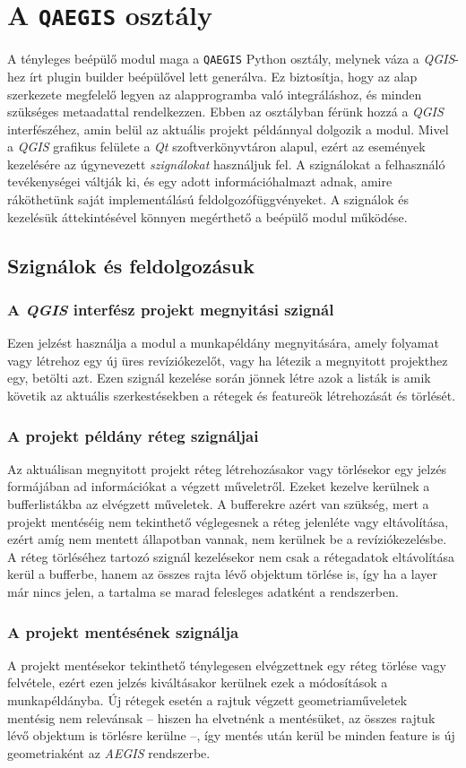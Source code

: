 \section{A \texttt{QAEGIS} osztály}
A tényleges beépülő modul maga a \texttt{QAEGIS} Python osztály, melynek váza a \emph{QGIS}-hez írt plugin builder beépülővel lett generálva. Ez biztosítja, hogy az alap szerkezete megfelelő legyen az alapprogramba való integráláshoz, és minden szükséges metaadattal rendelkezzen. Ebben az osztályban férünk hozzá a \emph{QGIS} interfészéhez, amin belül az aktuális projekt példánnyal dolgozik a modul. Mivel a \emph{QGIS} grafikus felülete a \emph{Qt} szoftverkönyvtáron alapul, ezért az események kezelésére az úgynevezett \emph{szignálokat} használjuk fel. A szignálokat a felhasználó tevékenységei váltják ki, és egy adott információhalmazt adnak, amire ráköthetünk saját implementálású feldolgozófüggvényeket. A szignálok és kezelésük áttekintésével könnyen megérthető a beépülő modul működése.
\subsection{Szignálok és feldolgozásuk}
\subsubsection{A \emph{QGIS} interfész projekt megnyitási szignál}
Ezen jelzést használja a modul a munkapéldány megnyitására, amely folyamat vagy létrehoz egy új üres revíziókezelőt, vagy ha létezik a megnyitott projekthez egy, betölti azt. Ezen szignál kezelése során jönnek létre azok a listák is amik követik az aktuális szerkestésekben a rétegek és featureök létrehozását és törlését.
\subsubsection{A projekt példány réteg szignáljai}
Az aktuálisan megnyitott projekt réteg létrehozásakor vagy törlésekor egy jelzés formájában ad információkat a végzett műveletről. Ezeket kezelve kerülnek a bufferlistákba az elvégzett műveletek. A bufferekre azért van szükség, mert a projekt mentéséig nem tekinthető véglegesnek a réteg jelenléte vagy eltávolítása, ezért amíg nem mentett állapotban vannak, nem kerülnek be a revíziókezelésbe. A réteg törléséhez tartozó szignál kezelésekor nem csak a rétegadatok eltávolítása kerül a bufferbe, hanem az összes rajta lévő objektum törlése is, így ha a layer már nincs jelen, a tartalma se marad felesleges adatként a rendszerben.
\subsubsection{A projekt mentésének szignálja}
A projekt mentésekor tekinthető ténylegesen elvégzettnek egy réteg törlése vagy felvétele, ezért ezen jelzés kiváltásakor kerülnek ezek a módosítások a munkapéldányba. Új rétegek esetén a rajtuk végzett geometriaműveletek mentésig nem relevánsak -- hiszen ha elvetnénk a mentésüket, az összes rajtuk lévő objektum is törlésre kerülne --, így mentés után kerül be minden feature is új geometriaként az \emph{AEGIS} rendszerbe.
